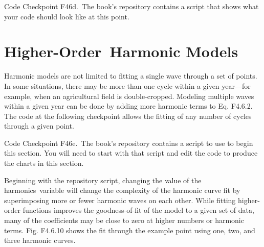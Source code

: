 \documentclass[
  letterpaper,
  DIV=11,
  numbers=noendperiod]{scrreprt}
\begin{document}
\begin{tcolorbox}[enhanced jigsaw, left=2mm, breakable, rightrule=.15mm, opacityback=0, colframe=quarto-callout-note-color-frame, colbacktitle=quarto-callout-note-color!10!white, arc=.35mm, opacitybacktitle=0.6, toptitle=1mm, colback=white, leftrule=.75mm, title=\textcolor{quarto-callout-note-color}{\faInfo}\hspace{0.5em}{Note}, toprule=.15mm, bottomtitle=1mm, titlerule=0mm, bottomrule=.15mm, coltitle=black]

Code Checkpoint F46d.~The book's repository contains a script that shows
what your code should look like at this point.

\end{tcolorbox}

\hypertarget{higher-order-harmonic-models}{%
\section{Higher-Order~Harmonic
Models}\label{higher-order-harmonic-models}}

Harmonic models are not limited to fitting a single wave through a set
of points. In some situations, there may be more than one cycle within a
given year---for example, when an agricultural field is double-cropped.
Modeling multiple waves within a given year can be done by adding more
harmonic terms to Eq. F4.6.2. The code at the following checkpoint
allows the fitting of any number of cycles through a given point.

\begin{tcolorbox}[enhanced jigsaw, left=2mm, breakable, rightrule=.15mm, opacityback=0, colframe=quarto-callout-note-color-frame, colbacktitle=quarto-callout-note-color!10!white, arc=.35mm, opacitybacktitle=0.6, toptitle=1mm, colback=white, leftrule=.75mm, title=\textcolor{quarto-callout-note-color}{\faInfo}\hspace{0.5em}{Note}, toprule=.15mm, bottomtitle=1mm, titlerule=0mm, bottomrule=.15mm, coltitle=black]

Code Checkpoint F46e.~The book's repository contains a script to use to
begin this section. You will need to start with that script and edit the
code to produce the charts in this section.

\end{tcolorbox}

Beginning with the repository script, changing the value of the
harmonics~variable will change the complexity of the harmonic curve fit
by superimposing more or fewer harmonic waves on each other. While
fitting higher-order functions improves the goodness-of-fit of the model
to a given set of data, many of the coefficients may be close to zero at
higher numbers or harmonic terms. Fig. F4.6.10 shows the fit through the
example point using one, two, and three harmonic curves.
\end{document}

